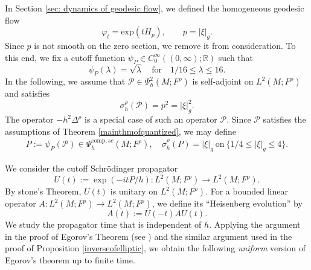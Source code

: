 \documentclass[11pt,oneside,reqno]{amsart}
\theoremstyle{definition}
\numberwithin{equation}{section}
\theoremstyle{plain}
\begin{document}
In Section \ref{sec: dynamics of geodesic flow}, we defined the homogeneous geodesic flow 
\begin{equation*}
    \varphi_{t}=\mathrm{exp}(tH_{p}), \qquad p=|\xi|_g.
\end{equation*}
Since $p$ is not smooth on the zero section, we remove it from consideration. To this end, we fix a cutoff function $\psi_P \in C_0^{\infty}((0, \infty) ; \mathbb{R})$ such that 
\begin{equation}\label{defofcutoff}
\psi_P(\lambda)=\sqrt{\lambda} \quad \text{for} \quad 1/16 \leq \lambda \leq 16.
\end{equation}
In the following, we assume that $\mathcal{P}\in \Psi_{h}^2(M;F^\rho)$ is self-adjoint on $L^2(M;F^{\rho})$ and satisfies 
\begin{equation*}
    \sigma_{h}^{\rho}(\mathcal{P})=p^2=|\xi|_g^2.
\end{equation*}
The operator $-h^2\Delta^{\rho}$ is a special case of such an operator $\mathcal{P}$. Since $\mathcal{P}$ satisfies the assumptions of Theorem \ref{mainthmofquantized}, we may define
\begin{equation}\label{defofcutofflaplacian}
\begin{aligned}
P:=\psi_P (\mathcal{P} ) \in \Psi^{\mathrm{comp},sc}_{h}(M;F^\rho), \quad \sigma_{h}^{\rho}(P)=|\xi|_g \ \text{on} \  \{1/4\leq |\xi|_{g}\leq 4 \}.
\end{aligned}
\end{equation}

We consider the cutoff Schrödinger propagator
\begin{equation}\label{schordingerpropagator}
U(t):=\exp  (-itP/h ): L^2(M;F^{\rho}) \rightarrow L^2(M;F^{\rho}).
\end{equation}
By stone's Theorem, $U(t)$ is unitary on $L^2(M;F^{\rho})$. For a bounded linear operator $A: L^2(M;F^{\rho}) \rightarrow L^2(M;F^{\rho})$, we define its ``Heisenberg evolution'' by
\begin{equation}\label{dyanamicsofoperator}
A(t):=U(-t) A U(t) .
\end{equation}
We study the propagator time that is independent of $h$. Applying the argument in the proof of Egorov's Theorem (see \cite[Theorem 11.1]{zworski2012semiclassicalanalysis}) and the similar argument used in the proof of Proposition \ref{inverseofelliptic}, we obtain the following \emph{uniform} version of Egorov's theorem up to finite time.
\end{document}
